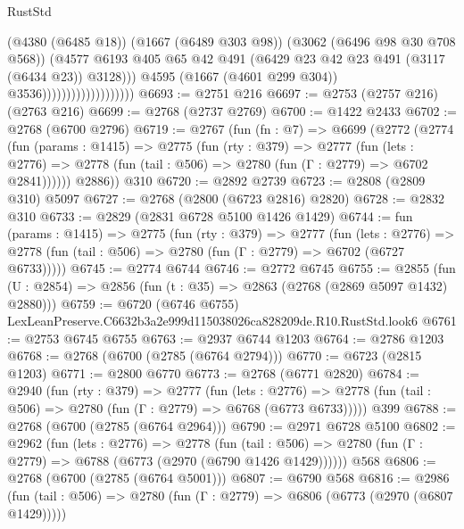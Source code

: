\begin{lexlean}{RustStd}
\begin{coremodule}
                                            (@4380 (@6485 @18))
                                            (@1667 (@6489 @303 @98))
                                            (@3062 (@6496 @98 @30 @708 @568))
                                            (@4577
                                              @6193
                                              @405
                                              @65
                                              @42
                                              @491
                                              (@6429 @23 @42 @23 @491 (@3117 (@6434 @23)) @3128)))
                                          @4595
                                          (@1667 (@4601 @299 @304))
                                          @3536)))))))))))))))))))
@6693 := @2751 @216
@6697 := @2753 (@2757 @216) (@2763 @216)
@6699 := @2768 (@2737 @2769)
@6700 := @1422 @2433
@6702 := @2768 (@6700 @2796)
@6719 := @2767
    (fun (fn : @7) =>
    @6699
      (@2772
        (@2774
          (fun (params : @1415) =>
          @2775
            (fun (rty : @379) =>
            @2777
              (fun (lets : @2776) =>
              @2778 (fun (tail : @506) => @2780 (fun (Γ : @2779) => @6702 @2841))))))
        @2886))
    @310
@6720 := @2892 @2739
@6723 := @2808 (@2809 @310) @5097
@6727 := @2768 (@2800 (@6723 @2816) @2820)
@6728 := @2832 @310
@6733 := @2829 (@2831 @6728 @5100 @1426 @1429)
@6744 := fun (params : @1415) =>
  @2775
    (fun (rty : @379) =>
    @2777
      (fun (lets : @2776) =>
      @2778 (fun (tail : @506) => @2780 (fun (Γ : @2779) => @6702 (@6727 @6733)))))
@6745 := @2774 @6744
@6746 := @2772 @6745
@6755 := @2855 (fun (U : @2854) => @2856 (fun (t : @35) => @2863 (@2768 (@2869 @5097 @1432) @2880)))
@6759 := @6720 (@6746 @6755) LexLeanPreserve.C6632b3a2e999d115038026ca828209de.R10.RustStd.look6
@6761 := @2753 @6745 @6755
@6763 := @2937 @6744 @1203
@6764 := @2786 @1203
@6768 := @2768 (@6700 (@2785 (@6764 @2794)))
@6770 := @6723 (@2815 @1203)
@6771 := @2800 @6770
@6773 := @2768 (@6771 @2820)
@6784 := @2940
    (fun (rty : @379) =>
    @2777
      (fun (lets : @2776) =>
      @2778 (fun (tail : @506) => @2780 (fun (Γ : @2779) => @6768 (@6773 @6733)))))
    @399
@6788 := @2768 (@6700 (@2785 (@6764 @2964)))
@6790 := @2971 @6728 @5100
@6802 := @2962
    (fun (lets : @2776) =>
    @2778
      (fun (tail : @506) => @2780 (fun (Γ : @2779) => @6788 (@6773 (@2970 (@6790 @1426 @1429))))))
    @568
@6806 := @2768 (@6700 (@2785 (@6764 @5001)))
@6807 := @6790 @568
@6816 := @2986
    (fun (tail : @506) => @2780 (fun (Γ : @2779) => @6806 (@6773 (@2970 (@6807 @1429)))))

\end{coremodule}
\end{lexlean}
